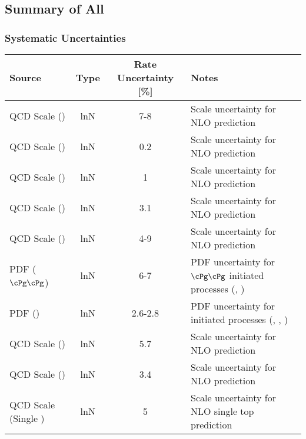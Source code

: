 
\subsection*{Summary of All}
\label{sec:systematics_summary}


\begin{frame}
	\frametitle{Systematic Uncertainties}
	\vspace*{-0.24cm}

\begin{table}[htbp]
	\color{black}
	\centering
  	\tiny
    \begin{tabular}{|l|c|c|l|}
		\hline
		Source                                            & Type  & Rate Uncertainty [\%] & Notes \\
		\hline
		QCD Scale (\ggH)                                  & lnN   & 7-8         & Scale uncertainty for NLO \ggH prediction \\
		QCD Scale (\qqH)                                  & lnN   & 0.2         & Scale uncertainty for NLO \qqH prediction \\
		QCD Scale (\ZH)                                   & lnN   & 1           & Scale uncertainty for NLO \ZH prediction \\
		QCD Scale (\WH)                                   & lnN   & 3.1         & Scale uncertainty for NLO \WH prediction \\
		QCD Scale (\ttH)                                  & lnN   & 4-9         & Scale uncertainty for NLO \ttH prediction \\
		\hline
		PDF ($\cPg\cPg$)                                  & lnN   & 6-7         & PDF uncertainty for $\cPg\cPg$ initiated processes (\ggH, \ttH) \\
		PDF (\qqbar)                                      & lnN   & 2.6-2.8     & PDF uncertainty for \qqbar initiated processes (\qqH, \WH, \ZH) \\
		\hline
		QCD Scale (\ttbar)                                & lnN   & 5.7         & Scale uncertainty for NLO \ttbar prediction \\
		QCD Scale (\Zjets)                                & lnN   & 3.4         & Scale uncertainty for NLO \Zjets prediction \\
		QCD Scale (Single \cPqt)                          & lnN   & 5           & Scale uncertainty for NLO single top prediction \\

\end{tabular}
\end{table}
\end{frame}
